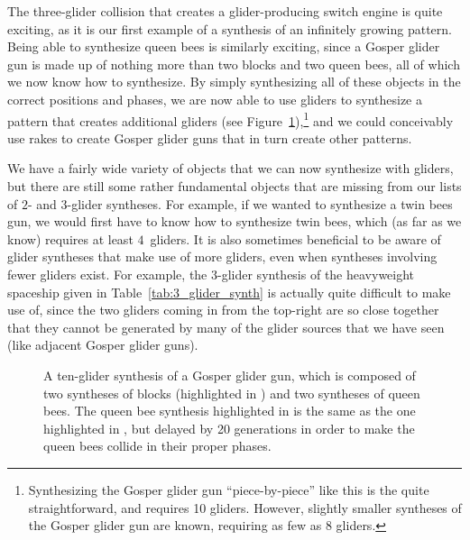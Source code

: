 The three-glider collision that creates a glider-producing switch engine is quite exciting, as it is our first example of a synthesis of an infinitely growing pattern. Being able to synthesize queen bees is similarly exciting, since a Gosper glider gun is made up of nothing more than two blocks and two queen bees, all of which we now know how to synthesize. By simply synthesizing all of these objects in the correct positions and phases, we are now able to use gliders to synthesize a pattern that creates additional gliders (see Figure~\ref{fig:gosper_glider_synth}),\footnote{Synthesizing the Gosper glider gun ``piece-by-piece'' like this is the quite straightforward, and requires 10 gliders. However, slightly smaller syntheses of the Gosper glider gun are known, requiring as few as 8 gliders.} and we could conceivably use rakes to create Gosper glider guns that in turn create other patterns.

We have a fairly wide variety of objects that we can now synthesize with gliders, but there are still some rather fundamental objects that are missing from our lists of $2$- and $3$-glider syntheses. For example, if we wanted to synthesize a twin bees gun, we would first have to know how to synthesize twin bees, which (as far as we know) requires at least $4$~gliders. It is also sometimes beneficial to be aware of glider syntheses that make use of more gliders, even when syntheses involving fewer gliders exist. For example, the $3$-glider synthesis of the heavyweight spaceship given in Table~\ref{tab:3_glider_synth} is actually quite difficult to make use of, since the two gliders coming in from the top-right are so close together that they cannot be generated by many of the glider sources that we have seen (like adjacent Gosper glider guns).

\begin{figure}[!htb]
	\centering{}
	\caption{A ten-glider synthesis of a Gosper glider gun, which is composed of two syntheses of blocks (highlighted in ) and two syntheses of queen bees. The queen bee synthesis highlighted in  is the same as the one highlighted in , but delayed by 20 generations in order to make the queen bees collide in their proper phases.}\label{fig:gosper_glider_synth}
\end{figure}

